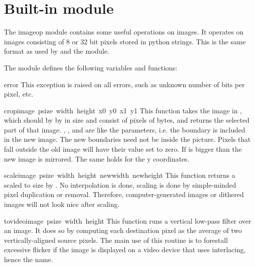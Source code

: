 \section{Built-in module }

The imageop module contains some useful operations on images.
It operates on images consisting of 8 or 32 bit pixels
stored in python strings. This is the same format as used
by  and the  module.

The module defines the following variables and functions:

\renewcommand{\indexsubitem}{(in module imageop)}

\begin{excdesc}{error}
This exception is raised on all errors, such as unknown number of bits
per pixel, etc.
\end{excdesc}


\begin{funcdesc}{crop}{image\, psize\, width\, height\, x0\, y0\, x1\, y1}
This function takes the image in , which should by
 by  in size and consist of pixels of
 bytes, and returns the selected part of that image. ,
,  and  are like the 
parameters, i.e. the boundary is included in the new image.
The new boundaries need not be inside the picture. Pixels that fall
outside the old image will have their value set to zero.
If  is bigger than  the new image is mirrored. The
same holds for the y coordinates.
\end{funcdesc}

\begin{funcdesc}{scale}{image\, psize\, width\, height\, newwidth\, newheight}
This function returns a  scaled to size  by
. No interpolation is done, scaling is done by
simple-minded pixel duplication or removal. Therefore, computer-generated
images or dithered images will not look nice after scaling.
\end{funcdesc}

\begin{funcdesc}{tovideo}{image\, psize\, width\, height}
This function runs a vertical low-pass filter over an image. It does
so by computing each destination pixel as the average of two
vertically-aligned source pixels. The main use of this routine is to
forestall excessive flicker if the image is displayed on a video
device that uses interlacing, hence the name.
\end{funcdesc}

